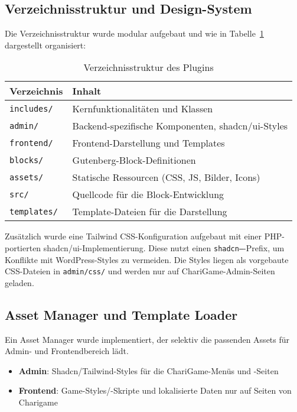\subsection{Verzeichnisstruktur und Design-System}
Die Verzeichnisstruktur wurde modular aufgebaut und wie in Tabelle~\ref{tab:directory-structure} dargestellt organisiert:

\begin{table}[H]
    \centering
    \begin{tabular}{|l|p{8cm}|}
        \hline
        \textbf{Verzeichnis} & \textbf{Inhalt} \\
        \hline
        \texttt{includes/} & Kernfunktionalitäten und Klassen \\
        \texttt{admin/} & Backend-spezifische Komponenten, shadcn/ui-Styles \\
        \texttt{frontend/} & Frontend-Darstellung und Templates \\
        \texttt{blocks/} & Gutenberg-Block-Definitionen \\
        \texttt{assets/} & Statische Ressourcen (CSS, JS, Bilder, Icons) \\
        \texttt{src/} & Quellcode für die Block-Entwicklung \\
        \texttt{templates/} & Template-Dateien für die Darstellung \\
        \hline
    \end{tabular}
    \caption{Verzeichnisstruktur des Plugins}
    \label{tab:directory-structure}
\end{table}

Zusätzlich wurde eine Tailwind CSS-Konfiguration aufgebaut mit einer PHP-portierten shadcn/ui-Implementierung.
Diese nutzt einen \texttt{shadcn--}-Prefix, um Konflikte mit WordPress-Styles zu vermeiden.
Die Styles liegen als vorgebaute CSS-Dateien in \texttt{admin/css/} und werden nur auf ChariGame-Admin-Seiten geladen.

\subsection{Asset Manager und Template Loader}
Ein Asset Manager wurde implementiert, der selektiv die passenden Assets für Admin- und Frontendbereich lädt.
\begin{itemize}
    \item \textbf{Admin}: Shadcn/Tailwind-Styles für die ChariGame-Menüs und -Seiten
    \item \textbf{Frontend}: Game-Styles/-Skripte und lokalisierte Daten nur auf Seiten von Charigame
\end{itemize}


